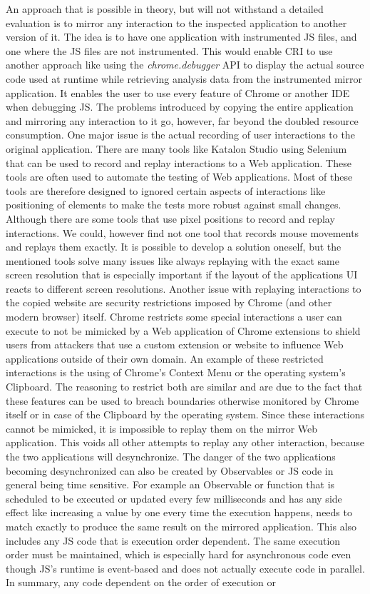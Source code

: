 An approach that is possible in theory, but will not withstand a detailed evaluation is to mirror any interaction to the inspected application to another version of it. The idea is to have one application with instrumented JS files, and one where the JS files are not instrumented. This would enable CRI to use another approach like using the \emph{chrome.debugger} API to display the actual source code used at runtime while retrieving analysis data from the instrumented mirror application. It enables the user to use every feature of Chrome or another IDE when debugging JS. The problems introduced by copying the entire application and mirroring any interaction to it go, however, far beyond the doubled resource consumption. One major issue is the actual recording of user interactions to the original application. There are many tools like Katalon Studio \cite{Katalon} using Selenium \cite{Selenium} that can be used to record and replay interactions to a Web application. These tools are often used to automate the testing of Web applications. Most of these tools are therefore designed to ignored certain aspects of interactions like positioning of elements to make the tests more robust against small changes. Although there are some tools that use pixel positions to record and replay interactions. We could, however find not one tool that records mouse movements and replays them exactly. It is possible to develop a solution oneself, but the mentioned tools solve many issues like always replaying with the exact same screen resolution that is especially important if the layout of the applications UI reacts to different screen resolutions. Another issue with replaying interactions to the copied website are security restrictions imposed by Chrome (and other modern browser) itself. Chrome restricts some special interactions a user can execute to not be mimicked by a Web application of Chrome extensions to shield users from attackers that use a custom extension or website to influence Web applications outside of their own domain. An example of these restricted interactions is the using of Chrome's Context Menu or the operating system's Clipboard. The reasoning to restrict both are similar and are due to the fact that these features can be used to breach boundaries otherwise monitored by Chrome itself or in case of the Clipboard by the operating system. Since these interactions cannot be mimicked, it is impossible to replay them on the mirror Web application. This voids all other attempts to replay any other interaction, because the two applications will desynchronize. The danger of the two applications becoming desynchronized can also be created by Observables or JS code in general being time sensitive. For example an Observable or function that is scheduled to be executed or updated every few milliseconds and has any side effect like increasing a value by one every time the execution happens, needs to match exactly to produce the same result on the mirrored application. This also includes any JS code that is execution order dependent. The same execution order must be maintained, which is especially hard for asynchronous code even though JS's runtime is event-based \cite{EventBasedJS} and does not actually execute code in parallel. In summary, any code dependent on the order of execution or 